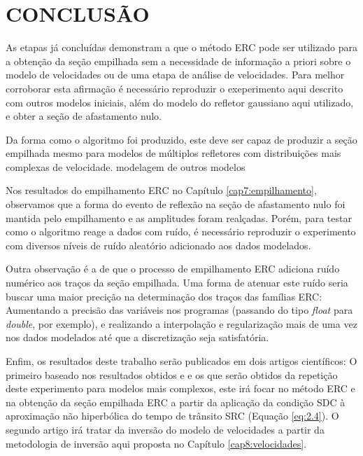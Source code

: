 \chapter{CONCLUSÃO}
\label{cap10:conclusao}

As etapas já concluídas demonstram a que o método ERC pode ser utilizado para a obtenção da seção empilhada sem a necessidade
de informação a priori sobre o modelo de velocidades ou de uma etapa de análise de velocidades. Para melhor corroborar esta 
afirmação é necessário reproduzir o exeperimento aqui descrito com outros modelos iniciais, além do modelo do refletor gaussiano
aqui utilizado, e obter a seção de afastamento nulo.

Da forma como o algoritmo foi produzido, este deve ser capaz de produzir a seção empilhada mesmo para modelos de múltiplos refletores
com distribuições mais complexas de velocidade.
modelagem de outros modelos

Nos resultados do empilhamento ERC no Capítulo \ref{cap7:empilhamento}, observamos que a forma do evento de reflexão na seção
de afastamento nulo foi mantida pelo empilhamento e as amplitudes foram realçadas. Porém, para testar como o algoritmo reage
a dados com ruído, é necessário reproduzir o experimento com diversos níveis de ruído aleatório adicionado aos dados modelados.

Outra observação é a de que o processo de empilhamento ERC adiciona ruído numérico aos traços da seção empilhada. Uma forma de
atenuar este ruído seria buscar uma maior precição na determinação dos traços das famílias ERC: Aumentando a precisão das variáveis
nos programas (passando do tipo \textit{float} para \textit{double}, por exemplo), e realizando a interpolação e regularização
mais de uma vez nos dados modelados até que a discretização seja satisfatória.

Enfim, os resultados deste trabalho serão publicados em dois artigos científicos: O primeiro baseado 
nos resultados obtidos e e os que 
serão obtidos da repetição deste experimento para modelos mais complexos, este irá focar no método ERC e na obtenção da seção
empilhada ERC a partir da aplicação da condição SDC à aproximação não hiperbólica do tempo de trânsito SRC (Equação \ref{eq:2.4}).
O segundo artigo irá tratar da inversão do modelo de velocidades a partir da metodologia de inversão aqui proposta
no Capítulo \ref{cap8:velocidades}.
